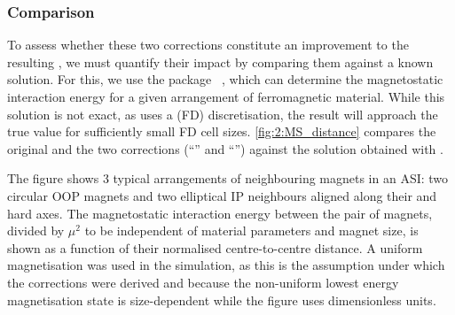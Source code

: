 \subsubsection{Comparison}
To assess whether these two corrections constitute an improvement to the resulting , we must quantify their impact by comparing them against a known solution.
For this, we use the  package \mumax~\cite{mumax3}, which can determine the magnetostatic interaction energy for a given arrangement of ferromagnetic material.
While this solution is not exact, as \mumax uses a  (FD) discretisation, the result will approach the true value for sufficiently small FD cell sizes.
\cref{fig:2:MS_distance} compares the original  and the two corrections (``'' and ``'') against the solution obtained with \mumax.

\vspace{-1.5em}

The figure shows 3 typical arrangements of neighbouring magnets in an ASI: two circular OOP magnets and two elliptical IP neighbours aligned along their  and hard axes.
The magnetostatic interaction energy between the pair of magnets, divided by $\mu^2$ to be independent of material parameters and magnet size, is shown as a function of their normalised centre-to-centre distance.
A uniform magnetisation was used in the \mumax simulation, as this is the assumption under which the corrections were derived and because the non-uniform lowest energy magnetisation state is size-dependent while the figure uses dimensionless units. \\\par

